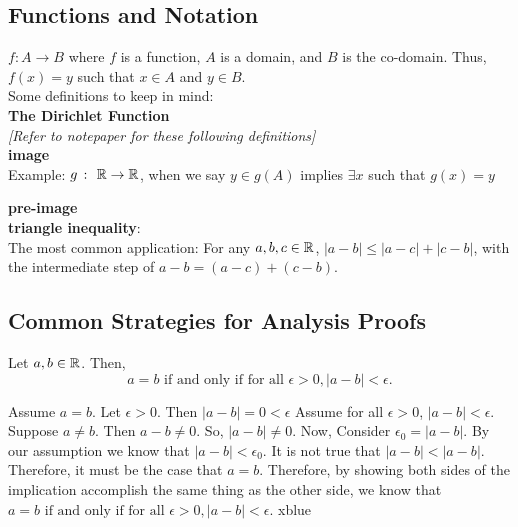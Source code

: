 \pfs

\subsection{Functions and Notation} \hfill

$f \colon A \rightarrow B$ where $f$ is a function, $A$ is a domain, and $B$ is the co-domain. Thus, $f(x) = y$ such that $x \in A$ and $y \in B$. \\

Some definitions to keep in mind: \\

\textbf{\Gls{The Dirichlet Function}} \\

\textit{[Refer to notepaper for these following definitions]} \\

\textbf{\Gls{image}} \\

Example: $g \ \colon \ \mathbb{R} \rightarrow \mathbb{R}$, when we say $y \in g(A)$ implies $\exists x$ such that $g(x) = y$

\textbf{\Gls{pre-image}} \\

\textbf{\Gls{triangle inequality}}: \\
The most common application: For any $a,b,c \in \mathbb{R}$, $|a - b| \leq |a-c| + |c-b|$, with the intermediate step of $a - b = (a-c) + (c-b)$.

\subsection{Common Strategies for Analysis Proofs} \hfill

\setcounter{BoxCounter}{5}
\begin{theorem}
    Let $a,b \in \mathbb{R}$. Then, $$a = b \text{ if and only if for all } \epsilon > 0, |a-b| < \epsilon.$$
\end{theorem}

\iffpf
    {Assume $a = b$. Let $\epsilon > 0$. Then $|a-b| = 0 < \epsilon$}
    {Assume for all $\epsilon > 0$, $|a-b| < \epsilon$. Suppose $a \ne b$. Then $a - b \ne 0$. So, $|a-b| \ne 0$. Now, Consider $\epsilon_0 = |a-b|$. By our assumption we know that $|a-b| < \epsilon_0$. It is not true that $|a-b| < |a - b|$. Therefore, it must be the case that $a = b$.}
    {Therefore, by showing both sides of the implication accomplish the same thing as the other side, we know that $a = b \text{ if and only if for all } \epsilon > 0, |a-b| < \epsilon.$}
    {xblue}

